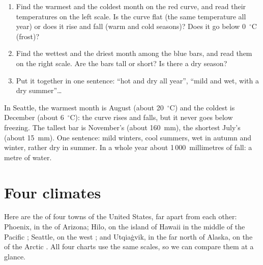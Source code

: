 \begin{method}\label{met:g5:weather-and-climate:reading}
\begin{enumerate}
  \item Find the warmest and the coldest month on the red curve, and read
        their temperatures on the left scale. Is the curve flat (the same
        temperature all year) or does it rise and fall (warm and cold
        seasons)? Does it go below 0~$^\circ$C (frost)?
  \item Find the wettest and the driest month among the blue bars, and read
        them on the right scale. Are the bars tall or short? Is there a dry
        season?
  \item Put it together in one sentence: ``hot and dry all year'', ``mild
        and wet, with a dry summer''{\ldots}
\end{enumerate}
\end{method}

\begin{example}[Seattle]\label{ex:g5:weather-and-climate:seattle}
In Seattle, the warmest month is August (about 20~$^\circ$C) and the
coldest is December (about 6~$^\circ$C): the curve rises and falls, but it
never goes below freezing. The tallest bar is November's (about 160~mm),
the shortest July's (about 15~mm). One sentence: mild winters, cool
summers, wet in autumn and winter, rather dry in summer. In a whole year
about 1\,000~millimetres of  fall: a metre of water.
\end{example}

\section{Four climates}

Here are the  of four towns of the United States, far apart
from each other: Phoenix, in the  of Arizona; Hilo, on the island of
Hawaii in the middle of the Pacific ; Seattle, on the west ; and
Utqiaġvik, in the far north of Alaska, on the  of the Arctic .
All four charts use the same scales, so we can compare them at a glance.

